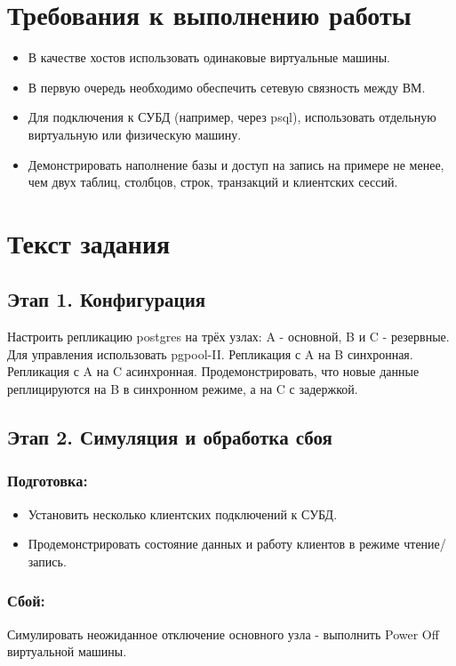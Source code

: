 \documentclass{article}
\begin{document}
\section{Требования к выполнению работы}

    \begin{itemize}
        \item В качестве хостов использовать одинаковые виртуальные машины.
        \item В первую очередь необходимо обеспечить сетевую связность между ВМ.
        \item Для подключения к СУБД (например, через psql), использовать отдельную виртуальную или физическую машину.
        \item Демонстрировать наполнение базы и доступ на запись на примере не менее, чем двух таблиц, столбцов, строк, транзакций и клиентских сессий.
    \end{itemize}

\section{Текст задания}

    \subsection{Этап 1. Конфигурация}
        Настроить репликацию postgres на трёх узлах: A - основной, B и C - резервные. Для управления использовать pgpool-II. Репликация с A на B синхронная. Репликация с A на C асинхронная. Продемонстрировать, что новые данные реплицируются на B в синхронном режиме, а на C с задержкой.
    \subsection{Этап 2. Симуляция и обработка сбоя}
        \subsubsection{Подготовка:}
            \begin{itemize}
                \item Установить несколько клиентских подключений к СУБД.
                \item Продемонстрировать состояние данных и работу клиентов в режиме чтение/запись.
            \end{itemize}
        \subsubsection{Сбой:}
            Симулировать неожиданное отключение основного узла - выполнить Power Off виртуальной машины.
\end{document}
